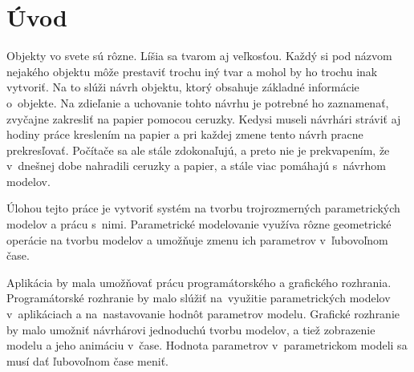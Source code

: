 


\lstset {language=C++,
basicstyle=\ttfamily,
  columns=fullflexible,
  breaklines=true,
  escapechar=\&
  }


\chapter{Úvod}

Objekty vo svete sú rôzne. Líšia sa tvarom aj veľkosťou. 
Každý si pod názvom nejakého objektu môže prestaviť trochu iný tvar a mohol by ho trochu inak vytvoriť. Na to slúži návrh objektu, ktorý obsahuje základné informácie o~objekte. Na zdieľanie a uchovanie tohto návrhu je potrebné ho zaznamenať, zvyčajne zakresliť  na papier pomocou ceruzky. Kedysi museli návrhári stráviť aj hodiny práce kreslením na papier a pri každej zmene tento návrh pracne prekresľovať. 
Počítače sa ale stále zdokonaľujú, a preto nie je prekvapením, že v~dnešnej dobe nahradili ceruzky a papier, a stále viac pomáhajú s~návrhom modelov.






Úlohou tejto práce je vytvoriť systém na tvorbu trojrozmerných parametrických modelov a prácu s~nimi. Parametrické modelovanie využíva rôzne geometrické operácie na tvorbu modelov a umožňuje zmenu ich parametrov v~ľubovoľnom čase. 



Aplikácia by mala umožňovať prácu programátorského a grafického rozhrania. Programátorské rozhranie by malo slúžiť na~využitie parametrických modelov v~aplikáciach a na~nastavovanie hodnôt parametrov modelu. Grafické rozhranie by malo umožniť návrhárovi jednoduchú tvorbu modelov, a tiež zobrazenie modelu a jeho animáciu v~čase. Hodnota parametrov v~parametrickom modeli sa musí dať ľubovoľnom čase meniť.

